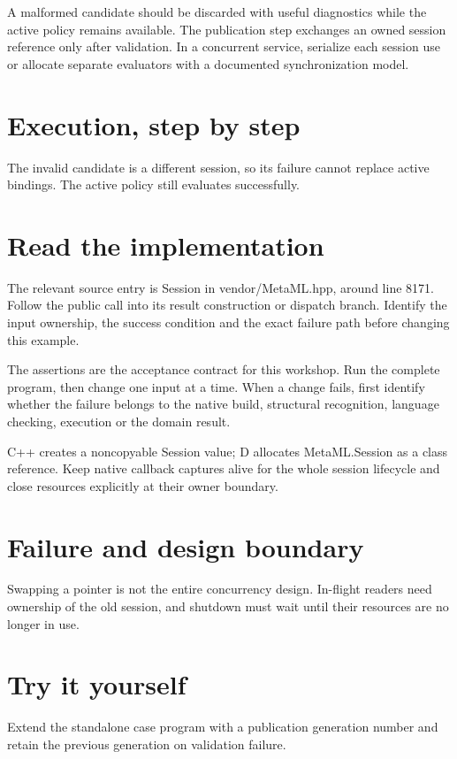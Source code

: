 \clearpage
{}
A malformed candidate should be discarded with useful diagnostics while the active policy remains available. The publication step exchanges an owned session reference only after validation. In a concurrent service, serialize each session use or allocate separate evaluators with a documented synchronization model.


\section*{Execution, step by step}
The invalid candidate is a different session, so its failure cannot replace active bindings. The active policy still evaluates successfully.

\section*{Read the implementation}
The relevant source entry is Session in vendor/MetaML.hpp, around line 8171. Follow the public call into its result construction or dispatch branch. Identify the input ownership, the success condition and the exact failure path before changing this example.

The assertions are the acceptance contract for this workshop. Run the complete program, then change one input at a time. When a change fails, first identify whether the failure belongs to the native build, structural recognition, language checking, execution or the domain result.

\clearpage
{}
C++ creates a noncopyable Session value; D allocates MetaML.Session as a class reference. Keep native callback captures alive for the whole session lifecycle and close resources explicitly at their owner boundary.


\section*{Failure and design boundary}
Swapping a pointer is not the entire concurrency design. In-flight readers need ownership of the old session, and shutdown must wait until their resources are no longer in use.

\section*{Try it yourself}
Extend the standalone case program with a publication generation number and retain the previous generation on validation failure.

